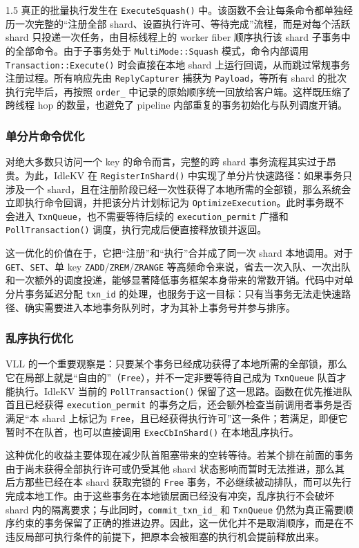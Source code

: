 \documentclass[a4paper,12pt,fontset=none,twoside]{article}
\numberwithin{figure}{section}
\numberwithin{equation}{section}
\numberwithin{table}{section}
\begin{document}
\begin{spacing}{1.5}
	真正的批量执行发生在 \texttt{ExecuteSquash()} 中。该函数不会让每条命令都单独经历一次完整的“注册全部 shard、设置执行许可、等待完成”流程，而是对每个活跃 shard 只投递一次任务，由目标线程上的 worker fiber 顺序执行该 shard 子事务中的全部命令。由于子事务处于 \texttt{MultiMode::Squash} 模式，命令内部调用 \texttt{Transaction::Execute()} 时会直接在本地 shard 上运行回调，从而跳过常规事务注册过程。所有响应先由 \texttt{ReplyCapturer} 捕获为 \texttt{Payload}，等所有 shard 的批次执行完毕后，再按照 \texttt{order\_} 中记录的原始顺序统一回放给客户端。这样既压缩了跨线程 hop 的数量，也避免了 pipeline 内部重复的事务初始化与队列调度开销。

	\subsubsection{单分片命令优化}
	对绝大多数只访问一个 key 的命令而言，完整的跨 shard 事务流程其实过于昂贵。为此，IdleKV 在 \texttt{RegisterInShard()} 中实现了单分片快速路径：如果事务只涉及一个 shard，且在注册阶段已经一次性获得了本地所需的全部锁，那么系统会立即执行命令回调，并把该分片计划标记为 \texttt{OptimizeExecution}。此时事务既不会进入 \texttt{TxnQueue}，也不需要等待后续的 \texttt{execution\_permit} 广播和 \texttt{PollTransaction()} 调度，执行完成后便直接释放锁并返回。

	这一优化的价值在于，它把“注册”和“执行”合并成了同一次 shard 本地调用。对于 \texttt{GET}、\texttt{SET}、单 key \texttt{ZADD}/\texttt{ZREM}/\texttt{ZRANGE} 等高频命令来说，省去一次入队、一次出队和一次额外的调度投递，能够显著降低事务框架本身带来的常数开销。代码中对单分片事务延迟分配 \texttt{txn\_id} 的处理，也服务于这一目标：只有当事务无法走快速路径、确实需要进入本地事务队列时，才为其补上事务号并参与排序。

	\subsubsection{乱序执行优化}	
	VLL 的一个重要观察是：只要某个事务已经成功获得了本地所需的全部锁，那么它在局部上就是“自由的”（\texttt{Free}），并不一定非要等待自己成为 \texttt{TxnQueue} 队首才能执行。IdleKV 当前的 \texttt{PollTransaction()} 保留了这一思路。函数在优先推进队首且已经获得 \texttt{execution\_permit} 的事务之后，还会额外检查当前调用者事务是否满足“本 shard 上标记为 \texttt{Free}，且已经获得执行许可”这一条件；若满足，即便它暂时不在队首，也可以直接调用 \texttt{ExecCbInShard()} 在本地乱序执行。

	这种优化的收益主要体现在减少队首阻塞带来的空转等待。若某个排在前面的事务由于尚未获得全部执行许可或仍受其他 shard 状态影响而暂时无法推进，那么其后方那些已经在本 shard 获取完锁的 \texttt{Free} 事务，不必继续被动排队，而可以先行完成本地工作。由于这些事务在本地锁层面已经没有冲突，乱序执行不会破坏 shard 内的隔离要求；与此同时，\texttt{commit\_txn\_id\_} 和 \texttt{TxnQueue} 仍然为真正需要顺序约束的事务保留了正确的推进边界。因此，这一优化并不是取消顺序，而是在不违反局部可执行条件的前提下，把原本会被阻塞的执行机会提前释放出来。


\end{spacing}
\end{document}
